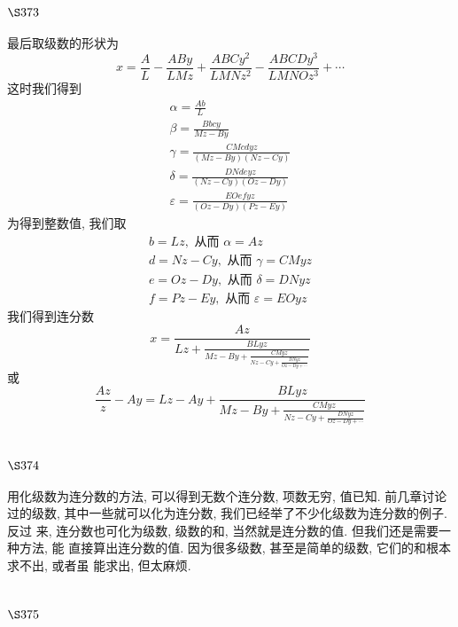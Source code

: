 \section{$\S 373$}

最后取级数的形状为
\[
x=\frac{A}{L}-\frac{A B y}{L M z}+\frac{A B C y^{2}}{L M N z^{2}}-\frac{A B C D y^{3}}{L M N O z^{3}}+\cdots
\]
这时我们得到
\[
\begin{gathered}
\alpha=\frac{A b}{L} \\
\beta=\frac{B b c y}{M z-B y} \\
\gamma=\frac{C M c d y z}{(M z-B y)(N z-C y)} \\
\delta=\frac{D N d e y z}{(N z-C y)(O z-D y)} \\
\varepsilon=\frac{E O e f y z}{(O z-D y)(P z-E y)}
\end{gathered}
\]
为得到整数值, 我们取
\[
\begin{gathered}
b=L z, \text { 从而 } \alpha=A z \\
d=N z-C y, \text { 从而 } \gamma=C M y z \\
e=O z-D y, \text { 从而 } \delta=D N y z \\
f=P z-E y, \text { 从而 } \varepsilon=E O y z
\end{gathered}
\]
我们得到连分数
\[
x=\frac{A z}{L z+\frac{B L y z}{M z-B y+\frac{C M y z}{N z-C y+\frac{D N y z}{O z-D y+\cdots}}}}
\]
或
\[
\frac{A z}{z}-A y=L z-A y+\frac{B L y z}{M z-B y+\frac{C M y z}{N z-C y+\frac{D N y z}{O z-D y+\cdots}}}
\]
\section{$\S 374$}

用化级数为连分数的方法, 可以得到无数个连分数, 项数无穷, 值已知. 前几章讨论 过的级数, 其中一些就可以化为连分数, 我们已经举了不少化级数为连分数的例子. 反过 来, 连分数也可化为级数, 级数的和, 当然就是连分数的值. 但我们还是需要一种方法, 能 直接算出连分数的值. 因为很多级数, 甚至是简单的级数, 它们的和根本求不出, 或者虽 能求出, 但太麻烦.

\section{$\S 375$}

